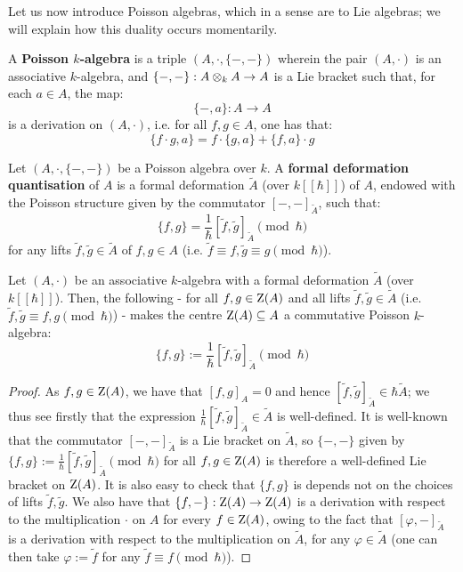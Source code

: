         Let us now introduce Poisson algebras, which in a sense are  to Lie algebras; we will explain how this duality occurs momentarily. 
        \begin{definition} \label{def: poisson_algebras}
            A \textbf{Poisson $k$-algebra} is a triple $(A, \cdot, \{-, -\})$ wherein the pair $(A, \cdot)$ is an associative $k$-algebra, and $\{-, -\}: A \tensor_k A \to A$ is a Lie bracket such that, for each $a \in A$, the map:
                $$\{-, a\}: A \to A$$
            is a derivation on $(A, \cdot)$, i.e. for all $f, g \in A$, one has that:
                $$\{f \cdot g, a\} = f \cdot \{g, a\} + \{f, a\} \cdot g$$
        \end{definition}
        \begin{definition} \label{def: deformation_quantisation}
            Let $(A, \cdot, \{-, -\})$ be a Poisson algebra over $k$. A \textbf{formal deformation quantisation} of $A$ is a formal deformation $\tilde{A}$ (over $k[\![\hbar]\!]$) of $A$, endowed with the Poisson structure given by the commutator $[-, -]_{\tilde{A}}$, such that:
                $$\{f, g\} = \frac{1}{\hbar}[\tilde{f}, \tilde{g}]_{\tilde{A}} \pmod{\hbar}$$
            for any lifts $\tilde{f}, \tilde{g} \in \tilde{A}$ of $f, g \in A$ (i.e. $\tilde{f} \equiv f, \tilde{g} \equiv g \pmod{\hbar}$).
        \end{definition}
        \begin{lemma} \label{lemma: poisson_brackets_from_formal_flat_deformations_of_commutative_algebras}
            Let $(A, \cdot)$ be an associative $k$-algebra with a formal deformation $\tilde{A}$ (over $k[\![\hbar]\!]$). Then, the following - for all $f, g \in \mathrm{Z}(A)$ and all lifts $\tilde{f}, \tilde{g} \in \tilde{A}$ (i.e. $\tilde{f}, \tilde{g} \equiv f, g \pmod{\hbar}$) - makes the centre $\mathrm{Z}(A) \subseteq A$ a commutative Poisson $k$-algebra:
                $$\{f, g\} := \frac{1}{\hbar}[\tilde{f}, \tilde{g}]_{\tilde{A}} \pmod{\hbar}$$
        \end{lemma}
            \begin{proof}
                As $f, g \in \mathrm{Z}(A)$, we have that $[f, g]_A = 0$ and hence $[\tilde{f}, \tilde{g}]_{\tilde{A}} \in \hbar \tilde{A}$; we thus see firstly that the expression $\frac{1}{\hbar}[\tilde{f}, \tilde{g}]_{\tilde{A}} \in \tilde{A}$ is well-defined. It is well-known that the commutator $[-, -]_{\tilde{A}}$ is a Lie bracket on $\tilde{A}$, so $\{-, -\}$ given by $\{f, g\} := \frac{1}{\hbar}[\tilde{f}, \tilde{g}]_{\tilde{A}} \pmod{\hbar}$ for all $f, g \in \mathrm{Z}(A)$ is therefore a well-defined Lie bracket on $\mathrm{Z}(A)$. It is also easy to check that $\{f, g\}$ is depends not on the choices of lifts $\tilde{f}, \tilde{g}$. We also have that $\{f, -\}: \mathrm{Z}(A) \to \mathrm{Z}(A)$ is a derivation with respect to the multiplication $\cdot$ on $A$ for every $f \in \mathrm{Z}(A)$, owing to the fact that $[\varphi, -]_{\tilde{A}}$ is a derivation with respect to the multiplication on $\tilde{A}$, for any $\varphi \in \tilde{A}$ (one can then take $\varphi := \tilde{f}$ for any $\tilde{f} \equiv f \pmod{\hbar}$).
            \end{proof}
